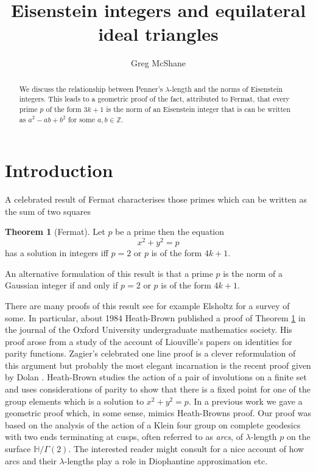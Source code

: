 \documentclass[12pt]{amsart}
\title{Eisenstein integers and equilateral ideal triangles}
\author[McShane]{Greg McShane}
\theoremstyle{plain}
\theoremstyle{definition}
\newtheorem{thm}{Theorem}[section]
\def\HH{\mathbb{H}}
\def\xx{\HH/g2}
\def\ZZ{\mathbb{Z}}
\def\g2{\Gamma(2)}
\def\xx{\HH/\g2}
\begin{document}
\maketitle

\begin{abstract} 
We discuss the relationship between Penner's $\lambda$-length
and the norms of Eisenstein integers. This leads to a geometric
proof of the fact, attributed to Fermat, that every prime $p$ of the form $3k + 1$
is the norm of an Eisenstein integer that is can be written
as $a^2 - ab + b^2$ for some $a,b \in \ZZ$.
\end{abstract} 


\section{Introduction}


A celebrated result of Fermat characterises
those primes which can be written as the sum of two squares

\begin{thm}[Fermat]\label{main}
Let $p$ be a prime then the equation
$$x^2 + y^2 = p $$
has a solution in integers  iff  $p =2$ or $p$ is of the form $4k + 1$.
\end{thm}

An alternative formulation of this result is that
a prime $p$ is the norm of a Gaussian integer
if and only if $p =2$ or $p$ is of the form $4k + 1$.

There are many proofs of this result see for example Elsholtz
\cite{elsholtz} for a survey of some.
In particular, about  1984 Heath-Brown published a proof of Theorem \ref{main} 
  in the journal of the Oxford University undergraduate mathematics society. 
His proof arose from a study of the account of Liouville’s papers on
identities for parity functions. Zagier's celebrated one line proof
\cite{zagier} is a clever reformulation of this argument but
probably the most elegant incarnation is the recent proof given by
Dolan \cite{dolan}. 
Heath-Brown studies the action of a pair of involutions on a finite set and uses considerations of parity to show that there is a fixed point for one of the group elements which is a solution 
to $x^2 + y^2 = p$.
In a previous work \cite{vlad} 
we gave a geometric proof which, in some sense,
mimics Heath-Browns proof.
Our proof was based on the analysis of the action of a  Klein four group 
on complete geodesics with two ends terminating at cusps, often referred to as \textit{arcs}, of
$\lambda$-length $p$ on the surface $\xx$.
The interested reader might consult \cite{springborn1, springborn2}
for a nice account of how arcs and their $\lambda$-lengths
play a role in Diophantine approximation etc.
\end{document}

